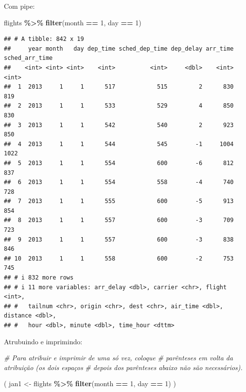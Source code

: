 \documentclass[
]{book}
\newenvironment{Shaded}{\begin{snugshade}}{\end{snugshade}}
\newcommand{\CommentTok}[1]{\textcolor[rgb]{0.56,0.35,0.01}{\textit{#1}}}
\newcommand{\DecValTok}[1]{\textcolor[rgb]{0.00,0.00,0.81}{#1}}
\newcommand{\FunctionTok}[1]{\textcolor[rgb]{0.13,0.29,0.53}{\textbf{#1}}}
\newcommand{\NormalTok}[1]{#1}
\newcommand{\OtherTok}[1]{\textcolor[rgb]{0.56,0.35,0.01}{#1}}
\newcommand{\SpecialCharTok}[1]{\textcolor[rgb]{0.81,0.36,0.00}{\textbf{#1}}}
\begin{document}
Com pipe:

\begin{Shaded}
\begin{Highlighting}[]
\NormalTok{flights }\SpecialCharTok{\%\textgreater{}\%} \FunctionTok{filter}\NormalTok{(month }\SpecialCharTok{==} \DecValTok{1}\NormalTok{, day }\SpecialCharTok{==} \DecValTok{1}\NormalTok{)}
\end{Highlighting}
\end{Shaded}

\begin{verbatim}
## # A tibble: 842 x 19
##     year month   day dep_time sched_dep_time dep_delay arr_time sched_arr_time
##    <int> <int> <int>    <int>          <int>     <dbl>    <int>          <int>
##  1  2013     1     1      517            515         2      830            819
##  2  2013     1     1      533            529         4      850            830
##  3  2013     1     1      542            540         2      923            850
##  4  2013     1     1      544            545        -1     1004           1022
##  5  2013     1     1      554            600        -6      812            837
##  6  2013     1     1      554            558        -4      740            728
##  7  2013     1     1      555            600        -5      913            854
##  8  2013     1     1      557            600        -3      709            723
##  9  2013     1     1      557            600        -3      838            846
## 10  2013     1     1      558            600        -2      753            745
## # i 832 more rows
## # i 11 more variables: arr_delay <dbl>, carrier <chr>, flight <int>,
## #   tailnum <chr>, origin <chr>, dest <chr>, air_time <dbl>, distance <dbl>,
## #   hour <dbl>, minute <dbl>, time_hour <dttm>
\end{verbatim}

Atrubuindo e imprimindo:

\begin{Shaded}
\begin{Highlighting}[]
\CommentTok{\# Para atribuir e imprimir de uma só vez, coloque}
\CommentTok{\# parênteses em volta da atribuição (os dois espaços}
\CommentTok{\# depois dos parênteses abaixo não são necessários).}

\NormalTok{(  jan1 }\OtherTok{\textless{}{-}}\NormalTok{ flights }\SpecialCharTok{\%\textgreater{}\%} \FunctionTok{filter}\NormalTok{(month }\SpecialCharTok{==} \DecValTok{1}\NormalTok{, day }\SpecialCharTok{==} \DecValTok{1}\NormalTok{)  )}
\end{Highlighting}
\end{Shaded}
\end{document}
